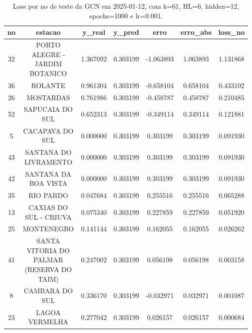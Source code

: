 \begin{table}[h]
\centering
\caption{Loss por no de teste da GCN em 2025-01-12, com k=61, HL=6, hidden=12, epochs=1000 e lr=0.001.}
\label{tab:gcn_loss_k61_hl6_h12_e1000_d20250112}
\begin{tabular}{ccccccc}
\toprule
no & estacao & y\_real & y\_pred & erro & erro\_abs & loss\_no \\
\midrule
32 & PORTO ALEGRE - JARDIM BOTANICO & 1.367092 & 0.303199 & -1.063893 & 1.063893 & 1.131868 \\
36 & ROLANTE & 0.961304 & 0.303199 & -0.658104 & 0.658104 & 0.433102 \\
26 & MOSTARDAS & 0.761986 & 0.303199 & -0.458787 & 0.458787 & 0.210485 \\
52 & SAPUCAIA DO SUL & 0.652313 & 0.303199 & -0.349114 & 0.349114 & 0.121881 \\
5 & CACAPAVA DO SUL & 0.000000 & 0.303199 & 0.303199 & 0.303199 & 0.091930 \\
43 & SANTANA DO LIVRAMENTO & 0.000000 & 0.303199 & 0.303199 & 0.303199 & 0.091930 \\
42 & SANTANA DA BOA VISTA & 0.000000 & 0.303199 & 0.303199 & 0.303199 & 0.091930 \\
35 & RIO PARDO & 0.047684 & 0.303199 & 0.255516 & 0.255516 & 0.065288 \\
13 & CAXIAS DO SUL - CRIUVA & 0.075340 & 0.303199 & 0.227859 & 0.227859 & 0.051920 \\
25 & MONTENEGRO & 0.141144 & 0.303199 & 0.162055 & 0.162055 & 0.026262 \\
41 & SANTA VITORIA DO PALMAR (RESERVA DO TAIM) & 0.247002 & 0.303199 & 0.056198 & 0.056198 & 0.003158 \\
8 & CAMBARA DO SUL & 0.336170 & 0.303199 & -0.032971 & 0.032971 & 0.001087 \\
23 & LAGOA VERMELHA & 0.277042 & 0.303199 & 0.026157 & 0.026157 & 0.000684 \\
\bottomrule
\end{tabular}
\end{table}
